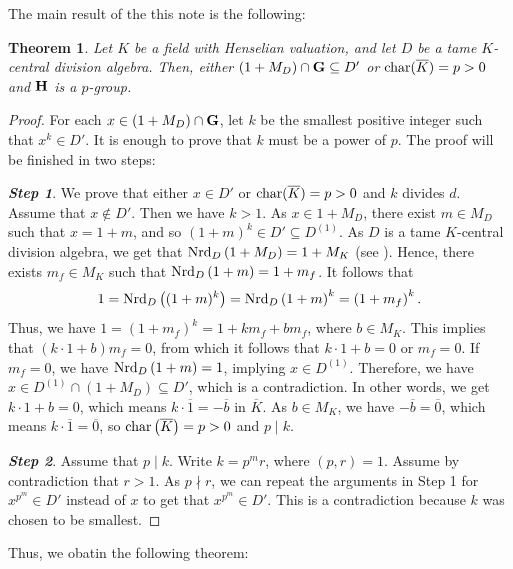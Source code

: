 \documentclass{amsart}
\newtheorem{theorem}{Theorem}
\theoremstyle{definition}
\numberwithin{equation}{section} %
\begin{document}
The main result of the this note is the following:
\begin{theorem}\label{Theorem_p-group}
	Let $K$ be a field with Henselian valuation, and let $D$ be a tame $K$-central division algebra. Then, either $(1+M_D) \cap {\bf G} \subseteq D'$ or ${\rm char}(\overline{K})=p>0$ and ${\bf H}$ is a $p$-group.
\end{theorem}
\begin{proof} 
	For each $x \in (1 + M_D) \cap {\bf G}$, let $k$ be the smallest positive integer such that $x^k\in D'$. It is enough to prove that $k$ must be a power of $p$. The proof will be finished  in two steps:
	
	\medskip 
	
	{\noindent \textit{\textbf{Step 1}}}. We prove that either $x\in D'$ or ${\rm char}(\overline{K})=p>0$ and $k$ divides $d$. Assume that $x \notin D'$. Then we have $k>1$. As $x \in 1+M_D$, there exist $m \in M_D$ such that $x = 1 + m$, and so $(1+m)^k \in D' \subseteq D^{(1)}$. As $D$ is a tame $K$-central division algebra, we get that ${\rm Nrd}_D\left(1+M_D\right) = 1+M_K$ (see \cite[Corollary 4.7]{hazrat-wadsworth-2011}). Hence, there exists $m_f \in M_K$ such that ${\rm Nrd}_D\left(1+m\right) = 1+m_f$. It follows that
	$$
	1={\rm Nrd}_D\left((1+m)^k\right) = {\rm Nrd}_D\left(1+m\right)^k = \left(1+m_f\right)^k.
	$$ 
	Thus, we have $1= \left(1+m_f\right)^k = 1+km_f + bm_f$, where $b \in M_K$. This implies that $(k\cdot 1+b)m_f = 0$, from which it follows that  $k\cdot 1 +b = 0$ or $m_f = 0$. If $m_f = 0$, we have ${\rm Nrd}_D\left(1+m\right) = 1$, implying $x \in D^{(1)}$. Therefore, we have $x \in D^{(1)} \cap \left(1+M_D\right) \subseteq D'$, which is a contradiction. In other words, we get $k\cdot 1 + b = 0$, which means $k \cdot \overline{1} = -\overline{b}$ in $\overline{K}$. As $b \in M_K$, we have $-\overline{b} = \overline{0}$, which means $k \cdot \overline{1} = 
	\overline{0}$, so ${\rm char}\left(\overline{K}\right) = p > 0$ and $p \mid  k$.
	
	\medskip 
		
	{\noindent \textit{\textbf{Step 2}}}. Assume that $p\mid k$. Write $k=p^mr$, where $(p,r)=1$. Assume by contradiction that $r>1$. As $p\nmid r$, we can repeat the arguments in Step 1 for $x^{p^m} \in D'$ instead of $x$ to get that $x^{p^m}\in D'$. This is a contradiction because $k$ was	chosen to be smallest.
\end{proof}

Thus, we obatin the following theorem:
\end{document}
